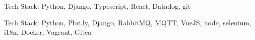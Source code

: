 \documentclass[letterpaper]{resume}
\begin{document}
\begin{compactitem}
\item Tech Stack: Python, Django, Typescript, React, Datadog, git
\end{compactitem}

\begin{compactitem}
\item Tech Stack: Python, Plot.ly, Django, RabbitMQ, MQTT, VueJS, node, selenium, i18n, Docker, Vagrant, Gitea
\end{compactitem}
\end{document}
